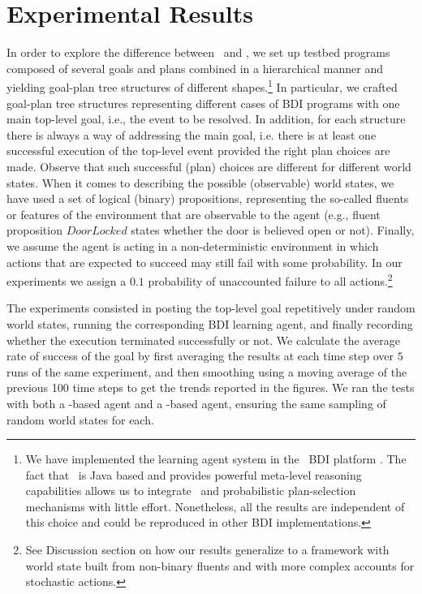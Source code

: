 \section{Experimental Results}\label{sec:experiments}

In order to explore the difference between \BUL\ and \CL, we set up testbed
programs composed of several goals and plans combined in a hierarchical manner
and yielding goal-plan tree structures of different shapes.\footnote{We have
implemented the learning agent system in the \JACK\ BDI platform
\cite{Busetta99jack}. The fact that \JACK\ is Java based and
provides powerful meta-level reasoning capabilities allows us to integrate \weka\ and
probabilistic plan-selection mechanisms with little effort. Nonetheless, all
the results are independent of this choice and could be reproduced in other BDI implementations.}
In particular, we crafted goal-plan tree structures representing different
cases of BDI programs with one main top-level goal, i.e., the event to
be resolved. In addition, for each structure there is always a way of addressing the main goal, i.e. there is at
least one successful execution of the top-level event provided the right plan
choices are made. Observe that such successful (plan) choices are different
for different world states.
When it comes to describing the possible (observable) world states, we have used
a set of logical (binary) propositions, representing the so-called fluents or
features of the environment that are observable to the agent (e.g., fluent
proposition $\mathit{DoorLocked}$ states whether the door is believed open or
not).
Finally, we assume the agent is acting in a non-deterministic environment in
which actions that are expected to succeed may still fail with some
probability. In our experiments we assign a $0.1$ probability of
unaccounted failure to all actions.\footnote{See Discussion section on how our
results generalize to a framework with world state built from non-binary fluents
and with more complex accounts for stochastic actions.}




The experiments consisted in posting the top-level goal repetitively under random
world states, running the corresponding  BDI learning agent, and finally
recording whether the execution terminated successfully or not.
We calculate the average rate of success of the goal by first averaging the
results at each time step over $5$ runs of the same experiment, and then
smoothing using a moving average of the previous 100 time steps to get the trends
reported in the figures.
We ran the tests with both a \BUL-based agent and a \CL-based agent, ensuring the
same sampling of random world states for each.

